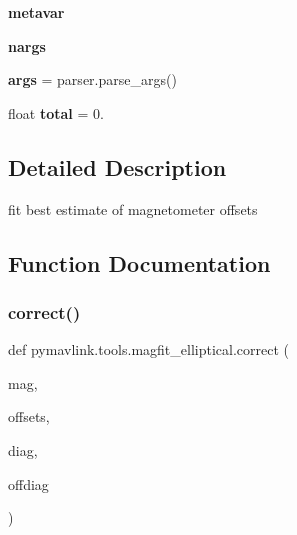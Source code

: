 \begin{DoxyCompactItemize}
{\bfseries metavar}
\item 
\mbox{\label{namespacepymavlink_1_1tools_1_1magfit__elliptical_ae35ec6f4f899b1d4c72de9be6f114537}} 
{\bfseries nargs}
\item 
\mbox{\label{namespacepymavlink_1_1tools_1_1magfit__elliptical_a69e14dd920bbdaf1717e57d936df3a31}} 
{\bfseries args} = parser.\+parse\+\_\+args()
\item 
\mbox{\label{namespacepymavlink_1_1tools_1_1magfit__elliptical_ae030b336a8082034bb05fa5688d765d1}} 
float {\bfseries total} = 0.
\end{DoxyCompactItemize}


\subsection{Detailed Description}
\begin{DoxyVerb}fit best estimate of magnetometer offsets
\end{DoxyVerb}
 

\subsection{Function Documentation}
\mbox{\label{namespacepymavlink_1_1tools_1_1magfit__elliptical_a20fabb2795bcf794156ea4dcd0de400a}} 
\subsubsection{\texorpdfstring{correct()}{correct()}}
{\footnotesize\ttfamily def pymavlink.\+tools.\+magfit\+\_\+elliptical.\+correct (\begin{DoxyParamCaption}\item[{}]{mag,  }\item[{}]{offsets,  }\item[{}]{diag,  }\item[{}]{offdiag }\end{DoxyParamCaption})}

